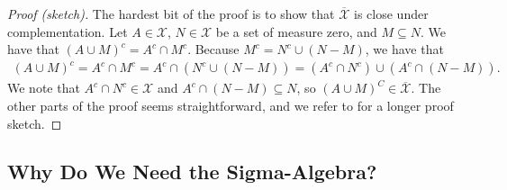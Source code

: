 \documentclass[10pt]{article}
\newcommand{\mcal}[1]{\mathcal{#1}}
\begin{document}
\begin{itemize}
  \begin{proof}[Proof (sketch)]
    The hardest bit of the proof is to show that $\overline{\mcal{X}}$ is close under complementation. Let $A \in \mcal{X}$, $N \in \mcal{X}$ be a set of measure zero, and $M \subseteq N$. We have that $(A \cup M)^c = A^c \cap M^c$. Because $M^c = N^c \cup (N - M)$, we have that
    \begin{align*}
      (A \cup M)^c = A^c \cap M^c = A^c \cap ( N^c \cup (N-M) ) = (A^c \cap N^c) \cup (A^c \cap (N-M)).
    \end{align*}
    We note that $A^c \cap N^c \in \mcal{X}$ and $A^c \cap (N - M) \subseteq N$, so $(A \cup M)^C \in \overline{\mcal{X}}$. The other parts of the proof seems straightforward, and we refer to \cite{Hunter:2011} for a longer proof sketch.
  \end{proof}
\end{itemize}

\subsection{Why Do We Need the Sigma-Algebra?}
\end{document}
